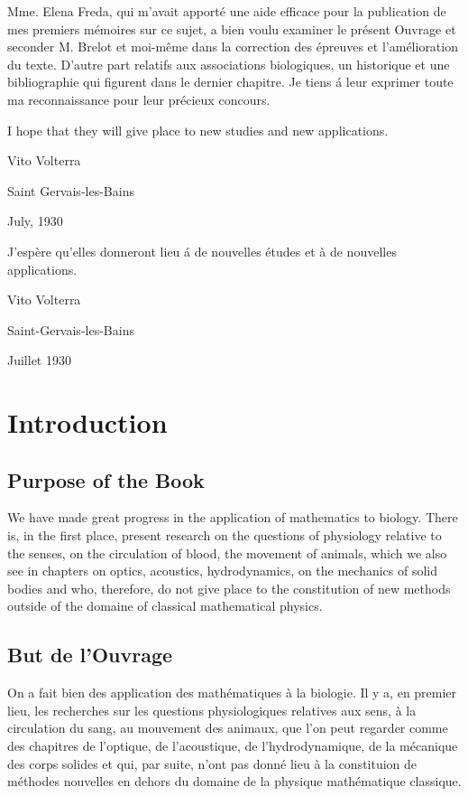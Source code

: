 \documentclass[crop=false,class=book,oneside]{standalone}
\begin{document}
\begin{paracol}{2}
\switchcolumn
\foreignlanguage{french}{
Mme. Elena Freda, qui m'avait apport\'{e} une aide efficace pour la publication de mes premiers m\'{e}moires sur ce sujet, a bien voulu examiner le pr\'{e}sent Ouvrage et seconder M. Brelot et moi-m\^{e}me dans la correction des \'{e}preuves et l'am\'{e}lioration du texte. D'autre part relatifs aux associations biologiques, un historique et une bibliographie qui figurent dans le dernier chapitre. Je tiens \'{a} leur exprimer toute ma reconnaissance pour leur pr\'{e}cieux concours.}
\par\hfill\par
\switchcolumn
I hope that they will give place to new studies and new applications.\par\hfill\par
Vito Volterra\hfill\par
Saint Gervais-les-Bains\hfill\par
July, 1930\par
\switchcolumn
\begin{sloppypar}
J'esp\`{e}re qu'elles donneront lieu \'{a} de nouvelles \'{e}tudes et \`{a} de nouvelles applications.\par\hfill\par
Vito Volterra\hfill\par
Saint-Gervais-les-Bains\hfill\par
Juillet 1930
\end{sloppypar}
\end{paracol}
\chapter{Introduction}
\begin{paracol}{2}
\section{Purpose of the Book}
We have made great progress in the application of mathematics to biology. There is, in the first place, present research on the questions of physiology relative to the senses, on the circulation of blood, the movement of animals, which we also see in chapters on optics, acoustics, hydrodynamics, on the mechanics of solid bodies and who, therefore, do not give place to the constitution of new methods outside of the domaine of classical mathematical physics.
\switchcolumn
\section{But de l'Ouvrage}
\begin{sloppypar}
On a fait bien des application des math\'{e}matiques \`{a} la biologie. Il y a, en premier lieu, les recherches sur les questions physiologiques relatives aux sens, \`{a} la circulation du sang, au mouvement des animaux, que l'on peut regarder comme des chapitres de l'optique, de l'acoustique, de l'hydrodynamique, de la m\'{e}canique des corps solides et qui, par suite, n'ont pas donn\'{e} lieu \`{a} la constituion de m\'{e}thodes nouvelles en dehors du domaine de la physique math\'{e}matique classique.
\end{sloppypar}
\end{paracol}
\end{document}
